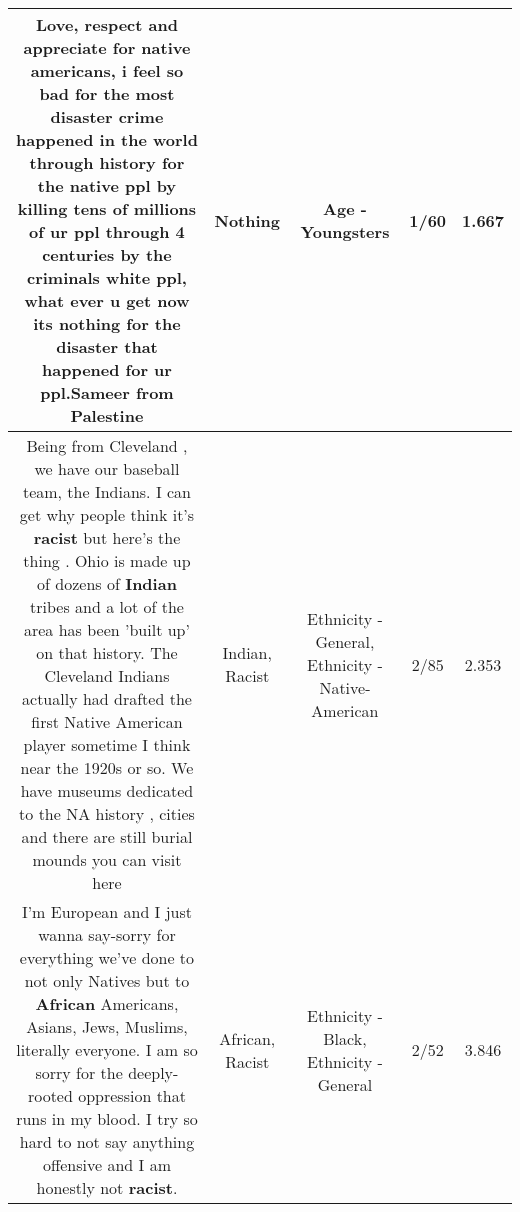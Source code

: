 \documentclass[11pt]{article}
\newlength\mylength
\begin{document}
\begin{center}
\begin{longtable}{|C{.65\mylength}|C{.30\mylength}|C{.12\mylength}|C{.12\mylength}|C{.12\mylength}|}
  \small Love, respect and appreciate for native americans, i feel so bad for the most disaster crime happened in the world through history for the native ppl by killing tens of millions of ur ppl through 4 centuries by the criminals white ppl, what ever u get now its \textbf{nothing} for the disaster that happened for ur ppl.Sameer from Palestine\normalsize   & Nothing & Age - Youngsters & 1/60 & 1.667 \\  \hline
  \small Being from Cleveland , we have our baseball team, the Indians. I can get why people think it's \textbf{racist} but here's the thing . Ohio is made up of dozens of \textbf{Indian} tribes and a lot of the area has been 'built up' on that history. The Cleveland Indians actually had drafted the first Native American player sometime I think near the 1920s or so. We have museums dedicated to the NA history , cities and there are still burial mounds you can visit here\normalsize   & Indian, Racist & Ethnicity - General, Ethnicity - Native-American & 2/85 & 2.353 \\  \hline
  \small I'm European and I just wanna say-sorry for everything we've done to not only Natives but to \textbf{African} Americans, Asians, Jews, Muslims, literally everyone. I am so sorry for the deeply-rooted oppression that runs in my blood. I try so hard to not say anything offensive and I am honestly not \textbf{racist}.\normalsize   & African, Racist & Ethnicity - Black, Ethnicity - General & 2/52 & 3.846 \\  \hline

\end{longtable}
\end{center}
\end{document}
